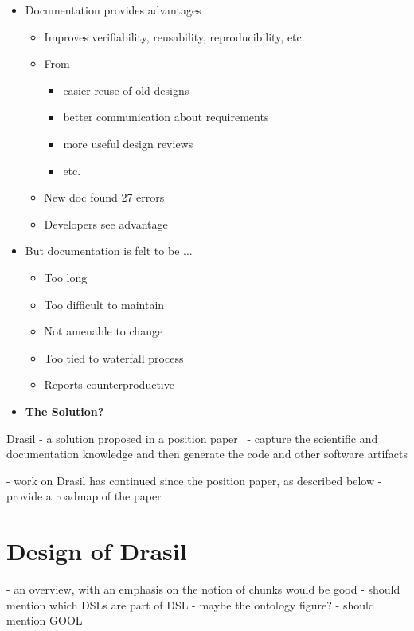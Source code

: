 \documentclass[sigconf]{acmart}
\begin{document}
\begin{itemize}
\item Documentation provides advantages
\begin{itemize}
\item Improves verifiability, reusability, reproducibility, etc.
\item From \cite{Parnas2010}
\begin{itemize}
\item easier reuse of old designs
\item better communication about requirements
\item more
  useful design reviews
\item etc.
\end{itemize}
\item New doc found 27 errors \citep{SmithAndKoothoor2016}
\item Developers see advantage \cite{SmithJegatheesanAndKelly2016}
\end{itemize}
\item But documentation is felt to be ...
\begin{itemize}
\item Too long
\item Too difficult to maintain
\item Not amenable to change
\item Too tied to waterfall process
\item Reports counterproductive \citep{Roache1998}
\end{itemize}
\item {\textbf{The Solution?}}
\end{itemize}

Drasil - a solution proposed in a position paper~\cite{SzymczakEtAl2016} - capture the scientific and documentation knowledge
and then generate the code and other software artifacts

- work on Drasil has continued since the position paper, as described below -
provide a roadmap of the paper

\section{Design of Drasil} \label{SecDevProcess}

- an overview, with an emphasis on the notion of chunks would be good - should
mention which DSLs are part of DSL - maybe the ontology figure?
- should mention GOOL
\end{document}
